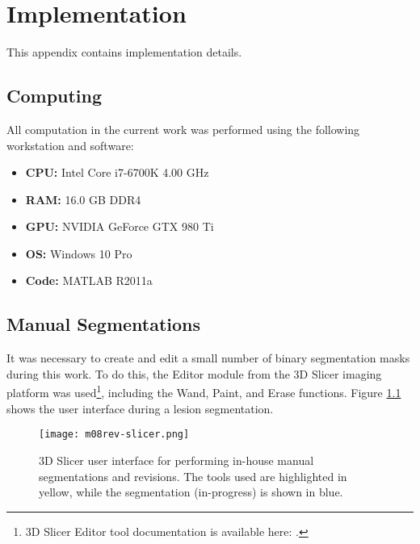 \chapter{Implementation}
This appendix contains implementation details.
\section{Computing}
All computation in the current work was performed using the following workstation and software:
\begin{itemize}[topsep=0pt,itemsep=0pt]
  \item \textbf{CPU:} Intel Core i7-6700K 4.00 GHz
  \item \textbf{RAM:} 16.0 GB DDR4
  \item \textbf{GPU:} NVIDIA GeForce GTX 980 Ti
  \item \textbf{OS:} Windows 10 Pro
  \item \textbf{Code:} MATLAB R2011a
\end{itemize}
\section{Manual Segmentations}
It was necessary to create and edit a small number of binary segmentation masks during this work. To do this, the Editor module from the 3D Slicer imaging platform \cite{Fedorov2012} was used\footnote{3D Slicer Editor tool documentation is available here: .}, including the Wand, Paint, and Erase functions. Figure \ref{fig:m08-rev-slicer} shows the user interface during a lesion segmentation.
\begin{figure}[h]
  \centering
  \texttt{[image: m08rev-slicer.png]}
  \caption{3D Slicer user interface for performing in-house manual segmentations and revisions. The tools used are highlighted in yellow, while the segmentation (in-progress) is shown in blue.}
  \label{fig:m08-rev-slicer}
\end{figure}
